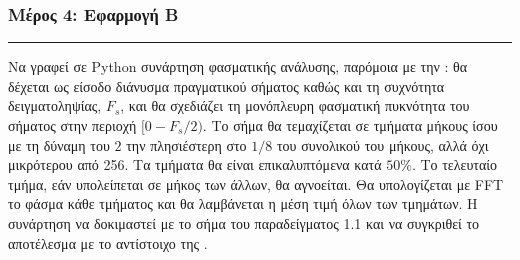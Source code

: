 \documentclass[letterpaper,10pt,english]{sphinxmanual}
\begin{document}
\begin{sphinxVerbatim}[commandchars=\\\{\}]
      
  

   
 
 
 
\end{sphinxVerbatim}

\noindent{}

\noindent{}


\subsubsection*{Μέρος 4:  Εφαρμογή Β}
\label{\detokenize{Exercise1_4:id1}}\label{\detokenize{Exercise1_4::doc}}

\bigskip\hrule\bigskip


\sphinxAtStartPar
Να γραφεί σε Python συνάρτηση φασματικής ανάλυσης, παρόμοια με την : θα δέχεται ως είσοδο διάνυσμα πραγματικού σήματος καθώς και τη συχνότητα δειγματοληψίας, \(F_s\), και θα σχεδιάζει τη μονόπλευρη φασματική πυκνότητα του σήματος στην περιοχή \([0-F_s/2)\). Το σήμα θα τεμαχίζεται σε τμήματα μήκους ίσου με τη δύναμη του \(2\) την πλησιέστερη στο \(1/8\) του συνολικού του μήκους, αλλά όχι μικρότερου από 256. Τα τμήματα θα είναι επικαλυπτόμενα κατά \(50\%\). Το τελευταίο τμήμα, εάν υπολείπεται σε μήκος των άλλων, θα αγνοείται. Θα υπολογίζεται με FFT το φάσμα κάθε τμήματος και θα λαμβάνεται η μέση τιμή όλων των τμημάτων. Η συνάρτηση να δοκιμαστεί με το σήμα του παραδείγματος 1.1 και να συγκριθεί το αποτέλεσμα με το αντίστοιχο της .
\end{document}
